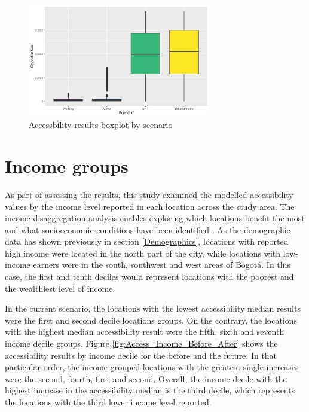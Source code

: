 \documentclass[12pt, a4paper]{report}
\begin{document}
\begin{figure}[H]
    \centering
    \includegraphics[width=8cm]{Data/Results/Images/Boxplot_Access_Scenarios.png}
    \caption{Accessbility results boxplot by scenario}
    \label{fig:Boxplot_Access_Scenarios}
\end{figure}

\section{Income groups}

As part of assessing the results, this study examined the modelled accessibility values by the income level reported in each location across the study area. The income disaggregation analysis enables exploring which locations benefit the most and what socioeconomic conditions have been identified \citep{pereiraIntroductionUrbanAccessibility2023a}. As the demographic data has shown previously in section \ref{Demographics}, locations with reported high income were located in the north part of the city, while locations with low-income earners were in the south, southwest and west areas of Bogotá. In this case, the first and tenth deciles would represent locations with the poorest and the wealthiest level of income. 

In the current scenario, the locations with the lowest accessibility median results were the first and second decile locations groups. On the contrary, the locations with the highest median accessibility result were the fifth, sixth and seventh income decile groups. Figure \ref{fig:Access_Income_Before_After} shows the accessibility results by income decile for the before and the future. In that particular order, the income-grouped locations with the greatest single increases were the second, fourth, first and second. Overall, the income decile with the highest increase in the accessibility median is the third decile, which represents the locations with the third lower income level reported.
\end{document}

